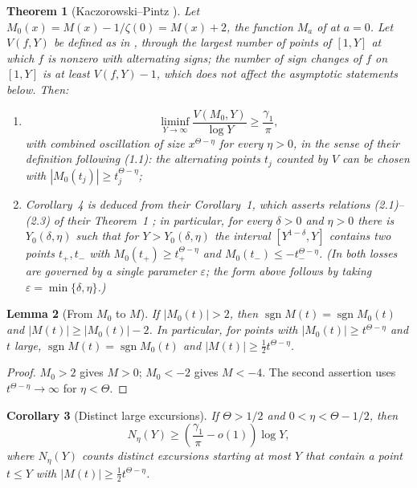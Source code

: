 \documentclass[11pt]{amsart}
\numberwithin{equation}{section}
\theoremstyle{plain}
\newtheorem{theorem}{Theorem}[section]
\newtheorem{lemma}[theorem]{Lemma}
\newtheorem{corollary}[theorem]{Corollary}
\theoremstyle{definition}
\theoremstyle{remark}
\DeclareMathOperator{\sgn}{sgn}
\begin{document}
\begin{theorem}[Kaczorowski--Pintz {\cite{KP86}}]
\label{thm:KP-quoted}
Let $M_0(x)=M(x)-1/\zeta(0)=M(x)+2$, the function $M_a$ of \cite{KP86} at
$a=0$. Let $V(f,Y)$ be defined as in \cite{KP86}, through the largest number of
points of $[1,Y]$ at which $f$ is nonzero with alternating signs; the number
of sign changes of $f$ on $[1,Y]$ is at least $V(f,Y)-1$, which does not
affect the asymptotic statements below. Then:
\begin{enumerate}[label=\textup{(\roman*)}]
\item \cite[Corollary~4, p.~178, (2.13)--(2.15)]{KP86}
\begin{equation}
\label{eq:KP-signchanges}
\liminf_{Y\to\infty}\frac{V(M_0,Y)}{\log Y}\ge\frac{\gamma_1}{\pi},
\end{equation}
with combined oscillation of size $x^{\Theta-\eta}$ for every $\eta>0$, in
the sense of their definition following (1.1): the alternating points $t_j$
counted by $V$ can be chosen with $|M_0(t_j)|\ge t_j^{\Theta-\eta}$;
\item Corollary~4 is deduced from their Corollary~1, which asserts relations
(2.1)--(2.3) of their Theorem~1 \cite[pp.~175--176]{KP86}; in particular,
for every $\delta>0$ and $\eta>0$ there is $Y_0(\delta,\eta)$ such that for
$Y>Y_0(\delta,\eta)$ the interval $[Y^{1-\delta},Y]$ contains two points
$t_+,t_-$ with $M_0(t_+)\ge t_+^{\Theta-\eta}$ and
$M_0(t_-)\le-t_-^{\Theta-\eta}$. (In \cite{KP86} both losses are governed
by a single parameter $\varepsilon$; the form above follows by taking
$\varepsilon=\min\{\delta,\eta\}$.)
\end{enumerate}
\end{theorem}

\begin{lemma}[From $M_0$ to $M$]
\label{lem:KP-translation}
If $|M_0(t)|>2$, then $\sgn M(t)=\sgn M_0(t)$ and
$|M(t)|\ge|M_0(t)|-2$. In particular, for points with
$|M_0(t)|\ge t^{\Theta-\eta}$ and $t$ large,
$\sgn M(t)=\sgn M_0(t)$ and $|M(t)|\ge\frac12t^{\Theta-\eta}$.
\end{lemma}

\begin{proof}
$M_0>2$ gives $M>0$; $M_0<-2$ gives $M<-4$. The second assertion uses
$t^{\Theta-\eta}\to\infty$ for $\eta<\Theta$.
\end{proof}

\begin{corollary}[Distinct large excursions]
\label{cor:KP-large-excursions}
\label{thm:KP-M}
If $\Theta>1/2$ and $0<\eta<\Theta-1/2$, then
\begin{equation}
\label{eq:KP-large-excursions}
N_\eta(Y)\ge\left(\frac{\gamma_1}{\pi}-o(1)\right)\log Y,
\end{equation}
where $N_\eta(Y)$ counts distinct excursions starting at most $Y$ that
contain a point $t\le Y$ with $|M(t)|\ge\tfrac12 t^{\Theta-\eta}$.
\end{corollary}
\end{document}

